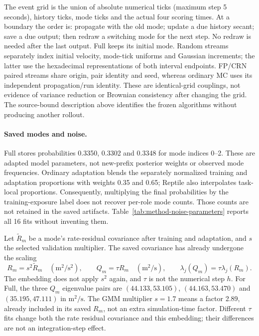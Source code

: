 \documentclass[11pt]{article}
\begin{document}
The event grid is the union of absolute numerical ticks (maximum step
5 seconds), history ticks, mode ticks and the actual four scoring times.
At a boundary the order is: propagate with the old mode; update a due history
secant; save a due output; then redraw a switching mode for the next step.
No redraw is needed after the last output. Full keeps its initial mode.
Random streams separately index initial velocity, mode-tick uniforms and
Gaussian increments; the latter use the hexadecimal representations of both
interval endpoints. FP/CRN paired streams share origin, pair identity and
seed, whereas ordinary MC uses its independent propagation/run identity.
These are identical-grid couplings, not evidence of variance reduction or
Brownian consistency after changing the grid. The source-bound description
above identifies the frozen algorithms without producing another rollout.

\paragraph{Saved modes and noise.}
Full stores probabilities 0.3350, 0.3302 and 0.3348 for mode indices
0--2. These are adapted model parameters, not new-prefix posterior weights
or observed mode frequencies. Ordinary adaptation blends the separately
normalized training and adaptation proportions with weights 0.35 and 0.65;
Reptile also interpolates task-local proportions. Consequently, multiplying
the final probabilities by the training-exposure label does not recover
per-role mode counts. Those counts are not retained in the saved artifacts.
Table~\ref{tab:method-noise-parameters} reports all 16 fits without inventing them.

Let $\widetilde R_m$ be a mode's rate-residual covariance after training and
adaptation, and $s$ the selected validation multiplier. The saved covariance
has already undergone the scaling
\begin{equation}
 R_m=s^2\widetilde R_m\quad(\mathrm{m}^2/\mathrm{s}^2),\qquad
 Q_m=\tau R_m\quad(\mathrm{m}^2/\mathrm{s}),\qquad
 \lambda_j(Q_m)=\tau\lambda_j(R_m).
 \label{eq:saved-method-noise}
\end{equation}
The embedding does not apply $s^2$ again, and $\tau$ is not the numerical
step $h$. For Full, the three $Q_m$ eigenvalue pairs are
$(44.133,53.105)$, $(44.163,53.470)$ and $(35.195,47.111)$ in
$\mathrm{m}^2/\mathrm{s}$. The GMM multiplier $s=1.7$ means a factor 2.89,
already included in its saved $R_m$, not an extra simulation-time factor.
Different $\tau$ fits change both the rate residual covariance and this
embedding; their differences are not an integration-step effect.
\end{document}
